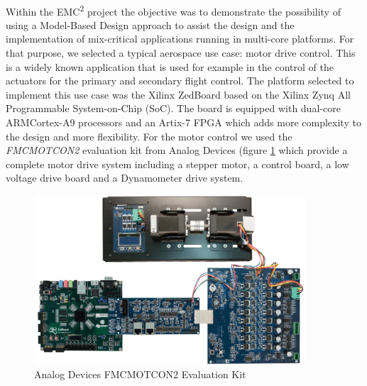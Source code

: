 \paragraph{} Within the EMC\textsuperscript{2} project the objective was to demonstrate the possibility of using a Model-Based Design approach to assist the design and the implementation of mix-critical applications running in multi-core platforms. For that purpose, we selected a typical aerospace use case: motor drive control. This is a widely known application that is used for example in the control of the actuators for the primary and secondary flight control. The platform selected to implement this use case was the Xilinx ZedBoard\texttrademark \cite{zedboard} based on the Xilinx Zynq All Programmable System-on-Chip (SoC). The board is equipped with dual-core ARM\textregistered Cortex-A9 processors and an Artix-7 FPGA which adds more complexity to the design and more flexibility. For the motor control we used the \emph{FMCMOTCON2} \cite{FMCMOTCON2} evaluation kit from Analog Devices (figure \ref{fig:fmcmotcon} which provide a complete motor drive system including a stepper motor, a control board, a low voltage drive board and a Dynamometer drive system.

\begin{figure}[htbp]
  \centering
  \includegraphics[width=0.9\textwidth]{FMCMOTCON2}
  \caption{Analog Devices FMCMOTCON2 Evaluation Kit}
  \label{fig:fmcmotcon}
\end{figure}

